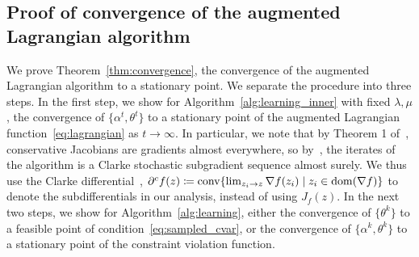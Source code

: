 \documentclass[11pt]{article}
\newcommand{\bsnote}[1]{\noindent\textcolor{red}{\texttt{Bartolomeo: #1}}}
\begin{document}
\begin{appendices}
\section{Proof of convergence of the augmented Lagrangian algorithm}
\label{appx:converge_stationary}
We prove Theorem~\ref{thm:convergence}, the convergence of the augmented Lagrangian algorithm to a stationary point.
We separate the procedure into three steps. In the first step, we show for Algorithm~\ref{alg:learning_inner} with fixed $\lambda,\mu$, the convergence of $\{\alpha^t,\theta^t\}$ to a stationary point of the augmented Lagrangian function~\eqref{eq:lagrangian} as $t \to \infty$.
In particular, we note that by Theorem 1 of~\cite{conservative}, conservative Jacobians are gradients almost everywhere, so by~\cite{path-diff}, the iterates of the algorithm is a Clarke stochastic subgradient sequence almost surely. 
We thus use the Clarke differential~\citep{Clarke},
$\partial^cf(z) \coloneqq {\rm conv}\{\lim_{z_i \rightarrow z} \nabla f(z_i) \mid z_i \in {\rm dom}(\nabla f)\}$ to denote the subdifferentials
in our analysis, instead of using $J_f(z)$.
In the next two steps, we show for Algorithm~\ref{alg:learning}, either the convergence of 
$\{\theta^k\}$ to a feasible point of condition~\eqref{eq:sampled_cvar}, or the convergence of $\{\alpha^k,\theta^k\}$ to a stationary point of the constraint violation function. 


\end{appendices}
\end{document}
